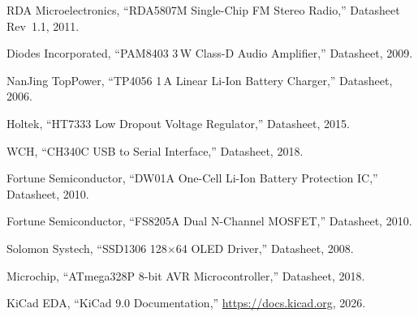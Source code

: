\begin{enumerate}[label={[\arabic*]}, nosep, leftmargin=2em]
    \item RDA Microelectronics, ``RDA5807M Single-Chip FM Stereo Radio,''
          Datasheet Rev~1.1, 2011.
    \item Diodes Incorporated, ``PAM8403 3\,W Class-D Audio Amplifier,''
          Datasheet, 2009.
    \item NanJing TopPower, ``TP4056 1\,A Linear Li-Ion Battery Charger,''
          Datasheet, 2006.
    \item Holtek, ``HT7333 Low Dropout Voltage Regulator,'' Datasheet, 2015.
    \item WCH, ``CH340C USB to Serial Interface,'' Datasheet, 2018.
    \item Fortune Semiconductor, ``DW01A One-Cell Li-Ion Battery Protection
          IC,'' Datasheet, 2010.
    \item Fortune Semiconductor, ``FS8205A Dual N-Channel MOSFET,''
          Datasheet, 2010.
    \item Solomon Systech, ``SSD1306 128$\times$64 OLED Driver,'' Datasheet,
          2008.
    \item Microchip, ``ATmega328P 8-bit AVR Microcontroller,'' Datasheet,
          2018.
    \item KiCad EDA, ``KiCad 9.0 Documentation,''
          \url{https://docs.kicad.org}, 2026.
\end{enumerate}
